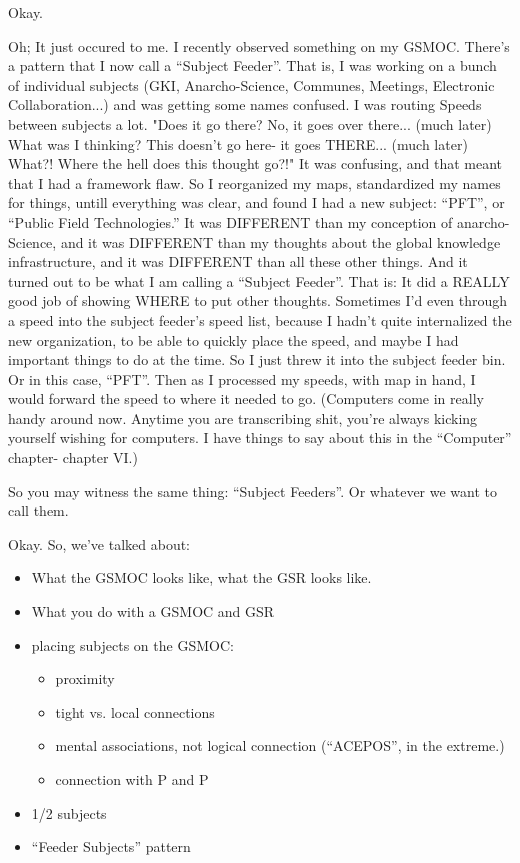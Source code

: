 \documentclass[oneside]{book}
\begin{document}
Okay.

Oh; It just occured to me. I recently observed something on my
GSMOC. There's a pattern that I now call a ``Subject Feeder''. That is,
I was working on a bunch of individual subjects (GKI, Anarcho-Science,
Communes, Meetings, Electronic Collaboration...) and was getting some
names confused. I was routing Speeds between subjects a lot. "Does it
go there? No, it goes over there... (much later) What was I thinking?
This doesn't go here- it goes THERE... (much later) What?! Where the
hell does this thought go?!" It was confusing, and that meant that I
had a framework flaw. So I reorganized my maps, standardized my names for
things, untill everything was clear, and found I had a new subject:
``PFT'', or ``Public Field Technologies.'' It was DIFFERENT than my
conception of anarcho-Science, and it was DIFFERENT than my thoughts
about the global knowledge infrastructure, and it was DIFFERENT than
all these other things. And it turned out to be what I am calling a
``Subject Feeder''. That is: It did a REALLY good job of showing WHERE
to put other thoughts. Sometimes I'd even through a speed into the
subject feeder's speed list, because I hadn't quite internalized the
new organization, to be able to quickly place the speed, and maybe I
had important things to do at the time. So I just threw it into the
subject feeder bin. Or in this case, ``PFT''. Then as I processed my
speeds, with map in hand, I would forward the speed to where it needed
to go. (Computers come in really handy around now. Anytime you are
transcribing shit, you're always kicking yourself wishing for
computers. I have things to say about this in the ``Computer'' chapter-
chapter VI.)

So you may witness the same thing: ``Subject Feeders''. Or whatever we
want to call them.

Okay. So, we've talked about:
\begin{itemize}
\item What the GSMOC looks like, what the GSR looks like.
\item What you do with a GSMOC and GSR
\item placing subjects on the GSMOC:
\begin{itemize}
  \item proximity
  \item tight vs. local connections
  \item mental associations, not logical connection (``ACEPOS'', in the
    extreme.)
  \item connection with P and P
\end{itemize}
\item 1/2 subjects
\item ``Feeder Subjects'' pattern
\end{itemize}
\end{document}
